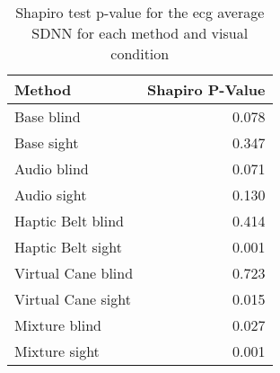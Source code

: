 
\begin{table}[!htb]
\centering
\caption{Shapiro test p-value for the ecg average SDNN for each method and visual condition}
\label{tab:shapiro_ecg_sdnn}
\begin{tabular}{lr}
\toprule
            Method &  Shapiro P-Value \\
\midrule
        Base blind &            0.078 \\
        Base sight &            0.347 \\
       Audio blind &            0.071 \\
       Audio sight &            0.130 \\
 Haptic Belt blind &            0.414 \\
 Haptic Belt sight &            0.001 \\
Virtual Cane blind &            0.723 \\
Virtual Cane sight &            0.015 \\
     Mixture blind &            0.027 \\
     Mixture sight &            0.001 \\
\bottomrule
\end{tabular}
\end{table}

